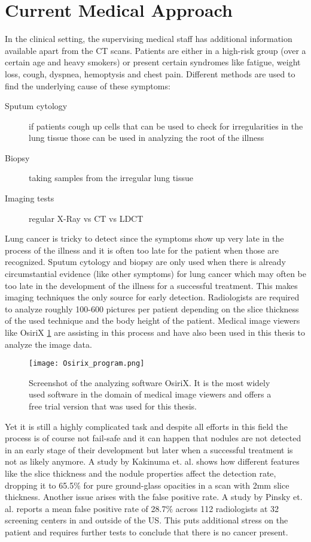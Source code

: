 \documentclass[main.tex]{subfiles}
\begin{document}
\section{Current Medical Approach}
In the clinical setting, the supervising medical staff has additional information available apart from the CT scans. Patients are either in a high-risk group (over a certain age and heavy smokers) or present certain syndromes like fatigue, weight loss, cough, dyspnea, hemoptysis and chest pain. Different methods are used to find the underlying cause of these symptoms:

\begin{description}
\item[Sputum cytology] if patients cough up cells that can be used to check for irregularities in the lung tissue those can be used in analyzing the root of the illness
\item[Biopsy] taking samples from the irregular lung tissue
\item[Imaging tests] regular X-Ray vs CT vs LDCT 
\end{description}

Lung cancer is tricky to detect since the symptoms show up very late in the process of the illness and it is often too late for the patient when those are recognized. Sputum cytology and biopsy are only used when there is already circumstantial evidence (like other symptoms) for lung cancer which may often be too late in the development of the illness for a successful treatment. This makes imaging techniques the only source for early detection. Radiologists are required to analyze roughly 100-600 pictures per patient depending on the slice thickness of the used technique and the body height of the patient. Medical image viewers like OsiriX \ref{fig:osirix} are assisting in this process and have also been used in this thesis to analyze the image data.

\begin{figure}[ht]
\texttt{[image: Osirix\_program.png]}
\caption{Screenshot of the analyzing software OsiriX. It is the most widely used software in the domain of medical image viewers and offers a free trial version that was used for this thesis.}
\label{fig:osirix}
\end{figure}

Yet it is still a highly complicated task and despite all efforts in this field the process is of course not fail-safe and it can happen that nodules are not detected in an early stage of their development but later when a successful treatment is not as likely anymore. A study by Kakinuma et. al.     \cite{kakinuma2012comparison} shows how different features like the slice thickness and the nodule properties affect the detection rate, dropping it to 65.5$\%$ for pure ground-glass opacities in a scan with 2mm slice thickness. Another issue arises with the false positive rate. A study by Pinsky et. al.\cite{pinsky2013national} reports a mean false positive rate of 28.7$\%$ across 112 radiologists at 32 screening centers in and outside of the US. This puts additional stress on the patient and requires further tests to conclude that there is no cancer present.
\end{document}
